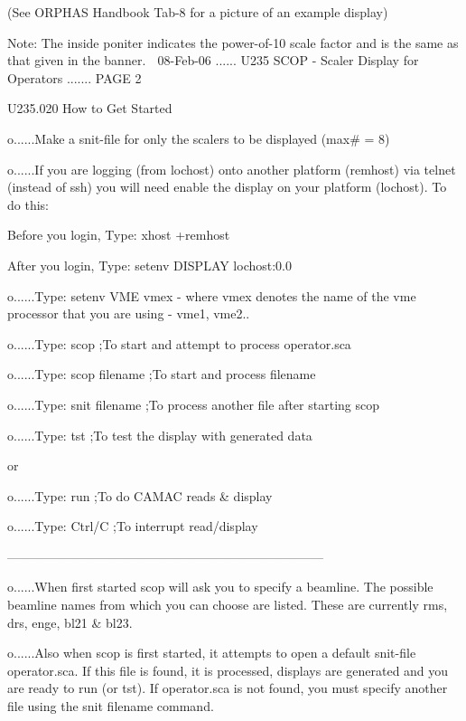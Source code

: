  
         (See ORPHAS Handbook Tab-8 for a picture of an example display)
 
 
 
 
 
 
 
 
   Note: The inside poniter indicates the power-of-10 scale factor and is  the
   same as that given in the banner.
    
   08-Feb-06 ...... U235  SCOP - Scaler Display for Operators ....... PAGE   2
 
 
   U235.020  How to Get Started
 
   o......Make a snit-file for only the scalers to be displayed (max# = 8)
 
   o......If you are logging (from lochost) onto another platform (remhost)
          via telnet (instead of ssh)  you will need enable the display on
          your platform (lochost). To do this:
 
          Before you login, Type: xhost +remhost
 
          After  you login, Type: setenv DISPLAY lochost:0.0
 
   o......Type: setenv VME vmex - where vmex denotes the name of the vme
                                  processor that you are using - vme1, vme2..
 
   o......Type: scop            ;To start and attempt to process operator.sca
 
   o......Type: scop  filename  ;To start and process filename
 
   o......Type: snit  filename  ;To process another file after starting scop
 
   o......Type: tst             ;To test the display with generated data
 
          or
 
   o......Type: run             ;To do CAMAC reads & display
 
   o......Type: Ctrl/C          ;To interrupt read/display
 
   ---------------------------------------------------------------------------
 
   o......When  first  started  scop   will ask you to specify a beamline. The
          possible beamline names from which you can choose are listed.  These
          are currently rms, drs, enge, bl21 & bl23.
 
   o......Also  when  scop  is  first  started,  it attempts to open a default
          snit-file operator.sca. If this file  is  found,  it  is  processed,
          displays  are  generated  and  you  are  ready  to  run (or tst). If
          operator.sca is not found, you must specify another file  using  the
          snit filename command.
 

